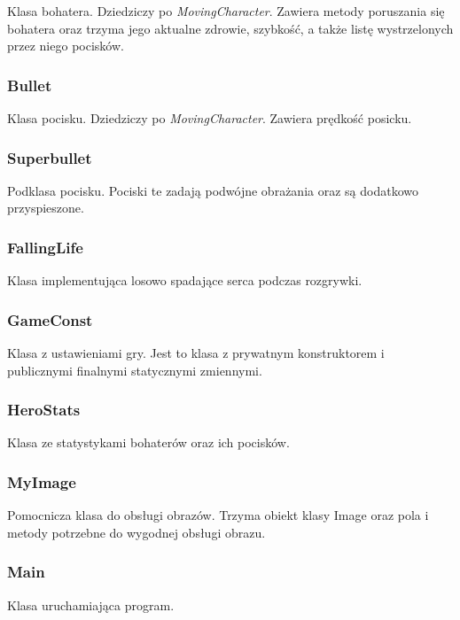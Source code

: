 \documentclass[a4paper,10pt]{article}
\begin{document}
Klasa bohatera. Dziedziczy po \textit{MovingCharacter}. Zawiera metody poruszania się bohatera oraz trzyma jego aktualne zdrowie, szybkość, a także listę wystrzelonych przez niego pocisków.

\subsubsection{Bullet}

Klasa pocisku. Dziedziczy po \textit{MovingCharacter}. Zawiera prędkość posicku.

\subsubsection{Superbullet}

Podklasa pocisku. Pociski te zadają podwójne obrażania oraz są dodatkowo przyspieszone.

\subsubsection{FallingLife}

Klasa implementująca losowo spadające serca podczas rozgrywki.

\subsubsection{GameConst}

Klasa z ustawieniami gry. Jest to klasa z prywatnym konstruktorem i publicznymi finalnymi statycznymi zmiennymi.

\subsubsection{HeroStats}

Klasa ze statystykami bohaterów oraz ich pocisków.

\subsubsection{MyImage}

Pomocnicza klasa do obsługi obrazów. Trzyma obiekt klasy Image oraz pola i metody potrzebne do wygodnej obsługi obrazu.

\subsubsection{Main}

Klasa uruchamiająca program.
\newpage
\end{document}
